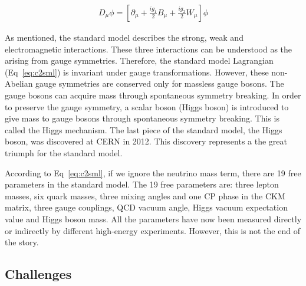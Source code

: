 \begin{equation}
 \begin{aligned}
  D_{\mu}\phi = [\partial_{\mu}+\frac{ig_{1}}{2}B_{\mu}+\frac{ig_{2}}{2}W_{\mu}]\phi
 \end{aligned}
 \label{eq:c2smldh}
\end{equation}

As mentioned, the standard model describes the strong, weak and electromagnetic interactions. These three interactions can be understood as the arising from gauge symmetries\cite{PhysRev.96.191}. Therefore, the standard model Lagrangian (Eq~\ref{eq:c2sml}) is invariant under gauge transformations. However, these non-Abelian gauge symmetries are conserved only for massless gauge bosons. The gauge bosons can acquire mass through spontaneous symmetry breaking\cite{PhysRevLett.4.380,PhysRev.122.345,PhysRev.124.246}. In order to preserve the gauge symmetry, a scalar boson (Higgs boson) is introduced to give mass to gauge bosons through spontaneous symmetry breaking. This is called the Higgs mechanism\cite{PhysRevLett.13.321,PhysRevLett.13.508}. The last piece of the standard model, the Higgs boson, was discovered at CERN in 2012\cite{Aad:2012tfa,Chatrchyan:2012xdj}. This discovery represents a the great triumph for the standard model\cite{PhysRevLett.19.1264,PhysRevLett.30.1343,PhysRevLett.30.1346}.

According to Eq~\ref{eq:c2sml}, if we ignore the neutrino mass term, there are 19 free parameters in the standard model. The 19 free parameters are: three lepton masses, six quark masses, three mixing angles and one CP phase in the CKM matrix\cite{PhysRevLett.10.531,Kobayashi:1973fv}, three gauge couplings, QCD vacuum angle, Higgs vacuum expectation value and Higgs boson mass. All the parameters have now been measured directly or indirectly by different high-energy experiments. However, this is not the end of the story. 

\clearpage
\subsection{Challenges}

